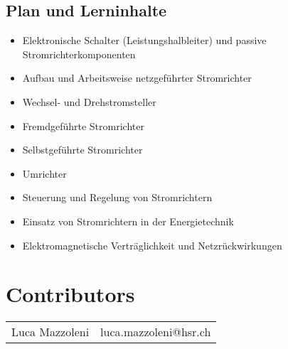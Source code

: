\subsection*{Plan und Lerninhalte}
{\scriptsize 
    \begin{itemize}
        \item Elektronische Schalter (Leistungshalbleiter) und passive Stromrichterkomponenten 
        \item Aufbau und Arbeitsweise netzgeführter Stromrichter 
        \item Wechsel- und Drehstromsteller 
        \item Fremdgeführte Stromrichter
        \item Selbstgeführte Stromrichter
        \item Umrichter
        \item Steuerung und Regelung von Stromrichtern
        \item Einsatz von Stromrichtern in der Energietechnik
        \item Elektromagnetische Verträglichkeit und Netzrückwirkungen
    \end{itemize}
}
\vfill
\section*{Contributors}
\begin{tabular}{ll}
    Luca Mazzoleni& luca.mazzoleni@hsr.ch \\ 
\end{tabular} 

